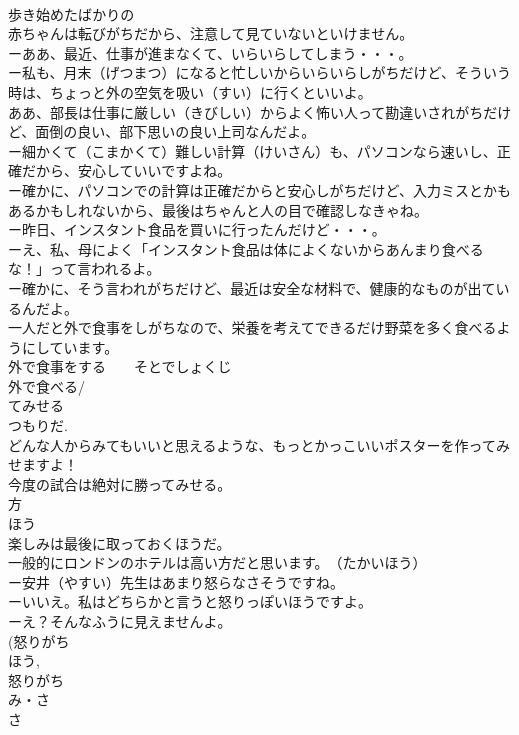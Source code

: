 \documentclass[8pt]{extreport}
\begin{document}
\begin{CJK}{UTF8}{min}
\\	歩き始めたばかりの
\\	赤ちゃんは転びがちだから、注意して見ていないといけません。
\\	ーああ、最近、仕事が進まなくて、いらいらしてしまう・・・。
\\	ー私も、月末（げつまつ）になると忙しいからいらいらしがちだけど、そういう時は、ちょっと外の空気を吸い（すい）に行くといいよ。
\\	ああ、部長は仕事に厳しい（きびしい）からよく怖い人って勘違いされがちだけど、面倒の良い、部下思いの良い上司なんだよ。　
\\	ー細かくて（こまかくて）難しい計算（けいさん）も、パソコンなら速いし、正確だから、安心していいですよね。
\\	ー確かに、パソコンでの計算は正確だからと安心しがちだけど、入力ミスとかもあるかもしれないから、最後はちゃんと人の目で確認しなきゃね。
\\	ー昨日、インスタント食品を買いに行ったんだけど・・・。
\\	ーえ、私、母によく「インスタント食品は体によくないからあんまり食べるな！」って言われるよ。
\\	ー確かに、そう言われがちだけど、最近は安全な材料で、健康的なものが出ているんだよ。
\\	一人だと外で食事をしがちなので、栄養を考えてできるだけ野菜を多く食べるようにしています。
\\	外で食事をする　　そとでしょくじ
\\	外で食べる/
\\	てみせる
\\	つもりだ.
\\	どんな人からみてもいいと思えるような、もっとかっこいいポスターを作ってみせますよ！
\\	今度の試合は絶対に勝ってみせる。
\\	方
\\	ほう
\\	楽しみは最後に取っておくほうだ。
\\	一般的にロンドンのホテルは高い方だと思います。　（たかいほう）
\\	ー安井（やすい）先生はあまり怒らなさそうですね。
\\	ーいいえ。私はどちらかと言うと怒りっぽいほうですよ。
\\	ーえ？そんなふうに見えませんよ。
\\	(怒りがち 
\\	ほう, 
\\	怒りがち 
\\	み・さ
\\	さ

\end{CJK}
\end{document}
